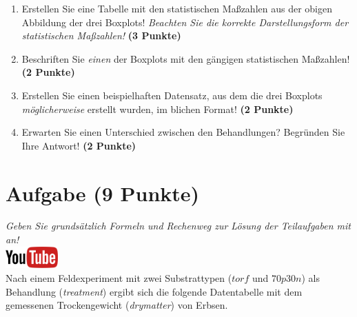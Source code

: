 \documentclass[a4paper, 9pt]{scrartcl}\usepackage[]{graphicx}\usepackage[]{xcolor}
\begin{document}
\begin{enumerate}
\item Erstellen Sie eine Tabelle mit den statistischen Ma{\ss}zahlen aus der
  obigen Abbildung der drei Boxplots! \textit{Beachten Sie die korrekte
    Darstellungsform der statistischen Ma{\ss}zahlen!} \textbf{(3 Punkte)}
\item Beschriften Sie \textit{einen} der Boxplots mit den g{\"a}ngigen
  statistischen Ma{\ss}zahlen! \textbf{(2 Punkte)}
\item Erstellen Sie einen beispielhaften Datensatz, aus dem die drei
  Boxplots \textit{m{\"o}glicherweise} erstellt wurden, im blichen Format! \textbf{(2 Punkte)}
\item Erwarten Sie einen Unterschied zwischen den Behandlungen? Begr{\"u}nden
  Sie Ihre Antwort! \textbf{(2 Punkte)}
\end{enumerate} 
\clearpage

\section{Aufgabe \hfill (9 Punkte)}

\textit{Geben Sie grunds{\"a}tzlich Formeln und Rechenweg zur L{\"o}sung der
  Teilaufgaben mit an!} \\[1Ex]

\hfill\href{https://youtu.be/0xc0jIPeiyw}{\includegraphics[width =
  2cm]{img/youtube}}\\[1Ex]



Nach einem Feldexperiment mit zwei Substrattypen ($torf$ und $70p30n$) als Behandlung
(\textit{treatment}) ergibt sich die folgende Datentabelle mit dem
gemessenen Trockengewicht (\textit{drymatter}) von Erbsen.
\end{document}
